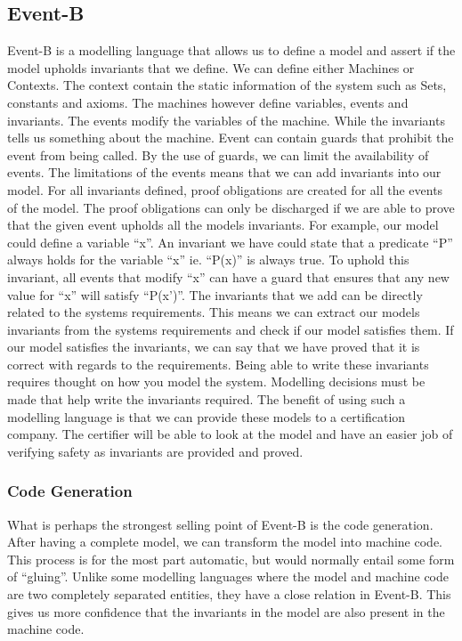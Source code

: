 \subsection{Event-B}
Event-B is a modelling language that allows us to define a model and assert if the model upholds invariants that we define. We can define either Machines or Contexts. The context contain the static information of the system such as Sets, constants and axioms. The machines however define variables, events and invariants. The events modify the variables of the machine. While the invariants tells us something about the machine. Event can contain guards that prohibit the event from being called. By the use of guards, we can limit the availability of events. The limitations of the events means that we can add invariants into our model. For all invariants defined, proof obligations are created for all the events of the model. The proof obligations can only be discharged if we are able to prove that the given event upholds all the models invariants. For example, our model could define a variable ``x''. An invariant we have could state that a predicate ``P'' always holds for the variable ``x'' ie. ``P(x)'' is always true. To uphold this invariant, all events that modify ``x'' can have a guard that ensures that any new value for ``x'' will satisfy ``P(x')''. The invariants that we add can be directly related to the systems requirements. This means we can extract our models invariants from the systems requirements and check if our model satisfies them. If our model satisfies the invariants, we can say that we have proved that it is correct with regards to the requirements. Being able to write these invariants requires thought on how you model the system. Modelling decisions must be made that help write the invariants required. The benefit of using such a modelling language is that we can provide these models to a certification company. The certifier will be able to look at the model and have an easier job of verifying safety as invariants are provided and proved.

\subsubsection{Code Generation}
What is perhaps the strongest selling point of Event-B is the code generation. After having a complete model, we can transform the model into machine code. This process is for the most part automatic, but would normally entail some form of ``gluing''. Unlike some modelling languages where the model and machine code are two completely separated entities, they have a close relation in Event-B. This gives us more confidence that the invariants in the model are also present in the machine code.

